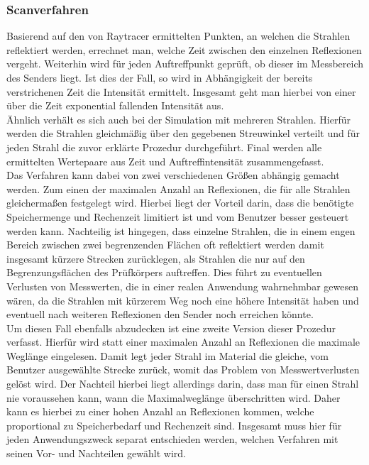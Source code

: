 \documentclass[reducespace,stylepage,semiarbeit]{spezidoc}
\begin{document}
\subsubsection{Scanverfahren} %
Basierend auf den von Raytracer ermittelten Punkten, an welchen die Strahlen reflektiert werden, errechnet man, welche Zeit zwischen den einzelnen Reflexionen vergeht.
Weiterhin wird für jeden Auftreffpunkt geprüft, ob dieser im Messbereich des Senders liegt. 
Ist dies der Fall, so wird in Abhängigkeit der bereits verstrichenen Zeit die Intensität ermittelt. 
Insgesamt geht man hierbei von einer über die Zeit exponential fallenden Intensität aus.\\
Ähnlich verhält es sich auch bei der Simulation mit mehreren Strahlen. 
Hierfür werden die Strahlen gleichmäßig über den gegebenen Streuwinkel verteilt und für jeden Strahl die zuvor erklärte Prozedur durchgeführt. 
Final werden alle ermittelten Wertepaare aus Zeit und Auftreffintensität zusammengefasst.\\
Das Verfahren kann dabei von zwei verschiedenen Größen abhängig gemacht werden. 
Zum einen der maximalen Anzahl an Reflexionen, die für alle Strahlen gleichermaßen festgelegt wird. Hierbei liegt der Vorteil darin, dass die benötigte Speichermenge und Rechenzeit limitiert ist und vom Benutzer besser gesteuert werden kann. 
Nachteilig ist hingegen, dass einzelne Strahlen, die in einem engen Bereich zwischen zwei begrenzenden Flächen oft reflektiert werden damit insgesamt kürzere Strecken zurücklegen, als Strahlen die nur auf den Begrenzungsflächen des Prüfkörpers auftreffen. 
Dies führt zu eventuellen Verlusten von Messwerten, die in einer realen Anwendung wahrnehmbar gewesen wären, da die Strahlen mit kürzerem Weg noch eine höhere Intensität haben und eventuell nach weiteren Reflexionen den Sender noch erreichen könnte.\\
Um diesen Fall ebenfalls abzudecken ist eine zweite Version dieser Prozedur verfasst. 
Hierfür wird statt einer maximalen Anzahl an Reflexionen die maximale Weglänge eingelesen. 
Damit legt jeder Strahl im Material die gleiche, vom Benutzer ausgewählte Strecke zurück, womit das Problem von Messwertverlusten gelöst wird. 
Der Nachteil hierbei liegt allerdings darin, dass man für einen Strahl nie voraussehen kann, wann die Maximalweglänge überschritten wird. 
Daher kann es hierbei zu einer hohen Anzahl an Reflexionen kommen, welche proportional zu Speicherbedarf und Rechenzeit sind. 
Insgesamt muss hier für jeden Anwendungszweck separat entschieden werden, welchen Verfahren mit seinen Vor- und Nachteilen gewählt wird.\\
\end{document}
